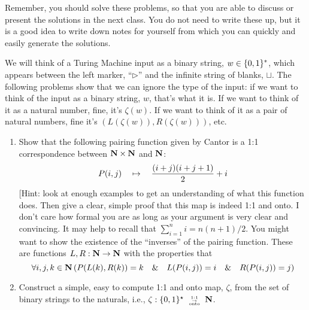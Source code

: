 \documentclass[12pt]{article}
\begin{document}
\noindent{}
\addtocounter{section}{1}

Remember, you should solve these problems, so that you are able to discuss or present the solutions
in the next class.  You do not need to write these up, but it is a good idea to write down
notes for yourself from which you can quickly and easily generate the solutions.

We will think of a Turing Machine input as a binary string, $w\in \{ 0,1 \}^*$, which appears
between the left marker, ``$\triangleright$'' and the infinite string of blanks, $\sqcup$.  The
following problems show that we can ignore the type of the input:  if we want to think of the input
as a binary string, $w$, that's what it is.  If we want to think of it as a natural number, fine,
it's $\zeta(w)$.  If we want to think
of it as a pair of natural numbers, fine it's $(L(\zeta(w)), R(\zeta(w)))$, etc.

\begin{enumerate}
\item Show that the following pairing function given by Cantor is a 1:1
correspondence between $\mbox{\bf N}\times\mbox{\bf N}$ and $\mbox{\bf N}$:
\[ P(i,j) \quad\mapsto\quad {(i+j)(i+j+1)\over 2} + i\]
[Hint: look at enough examples to get an understanding of what this
function does.  Then give a clear, simple proof that this map is indeed 1:1
and onto.  I don't care how formal you are as long as your argument is very clear
and convincing.  It may help to recall that $\sum_{i=1}^n i = n(n+1)/2$.
You might want to show the existence of the ``inverses'' of the pairing function.  These are
functions $L,R: \mbox{\bf N}\rightarrow \mbox{\bf N}$ with the properties that
\[ \forall i,j,k \in \mbox{\bf N} \,( P(L(k),R(k)) = k \quad \&\quad L(P(i,j)) = i \quad \&\quad R(P(i,j))= j)\]
\item Construct a simple, easy to compute 1:1 and onto map, $\zeta$, from the set of binary strings
  to the naturals, i.e., $\zeta: \set{0,1}^\star\bijection\N$.
\end{enumerate}
\end{document}
